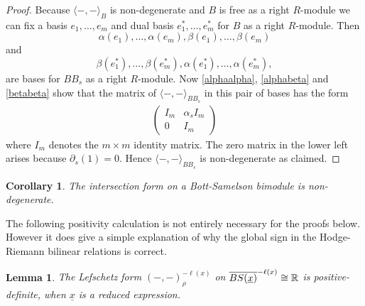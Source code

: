 \documentclass[11pt]{amsart}
\numberwithin{equation}{section}
\def\a{\alpha}
\def\b{\beta}
\def\ov{\overline}
\def\un{\underline}
\newtheorem{lem}[thm]{Lemma}
\newtheorem{cor}[thm]{Corollary}
\theoremstyle{definition}
\theoremstyle{remark}
\begin{document}
\begin{proof} Because $\langle -, - \rangle_B$ is non-degenerate 
 and $B$ is free as a right $R$-module we
  can fix a basis $e_1, \dots, e_m$ and dual basis $e_1^*, \dots,
  e_m^*$ for $B$ as a right $R$-module. Then
\[\a(e_1), \dots, \a(e_m),
  \b(e_1), \dots, \b(e_m)\]and
\[
  \b(e_1^*), \dots, \b(e_m^*),
\a(e_1^*), \dots, \a(e_m^*),
\]are bases for $BB_s$ as a right
  $R$-module. Now \eqref{alphaalpha}, \eqref{alphabeta} and
  \eqref{betabeta} show that the matrix of $\langle -, -
  \rangle_{BB_s}$ in this pair of bases has the form
\begin{gather*}
\left ( \begin{matrix} I_m & \a_s I_m \\
0 & I_m \end{matrix} \right )
\end{gather*}
where $I_m$ denotes the $m \times m$ identity matrix. The zero matrix in the lower left arises because $\partial_s(1)=0$.
Hence $\langle -, - \rangle_{BB_s}$ is non-degenerate as
  claimed.
\end{proof}

\begin{cor} The intersection form on a Bott-Samelson bimodule is non-degenerate. \end{cor}

The following positivity calculation is not entirely necessary for the proofs
below. However it does give a simple explanation of why the global sign in the
Hodge-Riemann bilinear relations is correct.

\begin{lem} \label{lem:BSpositivity} The Lefschetz form $(-,-)^{-\ell(x)}_\rho$ on $\ov{BS(\un{x})}^{-\ell(x)} \cong \RM$ is positive-definite, when $\un{x}$ is a reduced expression. \end{lem}
\end{document}
